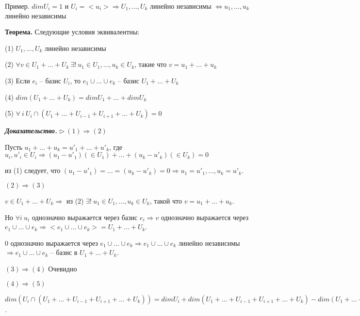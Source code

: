 \vspace{\baselineskip}
Пример. $dim U_i = 1$ и $U_i = <u_i> \Rightarrow U_1, \dots, U_k$ линейно независимы $\Leftrightarrow u_1, \dots, u_k$ линейно независимы

\vspace{\baselineskip}
\textbf{Теорема.} Следующие условия эквивалентны:

(1) $U_1, \dots, U_k$ линейно независимы

(2) $\forall v \in U_1 + \dots + U_k \ \exists! \ u_1 \in U_1, \dots, u_k \in U_k$, такие что $v = u_1 + \dots + u_k$

(3) Если $e_i$ -- базис $U_i$, то $e_1 \cup \dots \cup e_k$ -- базис $U_1 + \dots + U_k$

(4) $dim(U_1 + \dots + U_k) = dim U_1 + \dots + dim U_k$

(5) $\forall \ i \ U_i \cap (U_1 + \dots + U_{i-1} + U_{i+1} + \dots + U_k) = 0$

\vspace{\baselineskip}
\textbf{\textit{Доказательство.}} $\rhd \ (1) \Rightarrow (2)$ 

Пусть $u_1 + \dots + u_k = u'_1 + \dots + u'_k$, где $u_i, u'_i \in U_i \Rightarrow (u_1 - u'_1) (\in U_1) + \dots + (u_k - u'_k) (\in U_k) = 0$

из (1) следует, что $(u_1 - u'_1) = \dots = (u_k - u'_k) = 0 \Rightarrow u_1 = u'_1, \dots, u_k = u'_k$.

\vspace{\baselineskip}
$(2) \Rightarrow (3)$

$v \in U_1 + \dots + U_k \Rightarrow$ из (2) $\exists! \ u_1 \in U_1, \dots, u_k \in U_k$, такой что $v = u_1 + \dots + u_k$.

Но $\forall i \ u_i$ однозначно выражается через базис $e_i \Rightarrow v$ однозначно выражается через $e_1 \cup \dots \cup e_k \Rightarrow <e_1 \cup \dots \cup e_k> = U_1 + \dots + U_k$.

0 однозначно выражается через $e_1 \cup \dots \cup e_k \Rightarrow e_1 \cup \dots \cup e_k$ линейно независимы $\Rightarrow e_1 \cup \dots \cup e_k$ -- базис в $U_1 + \dots + U_k$.

\vspace{\baselineskip}
$(3) \Rightarrow (4)$ Очевидно

\vspace{\baselineskip}
$(4) \Rightarrow (5)$

$dim (U_i \cap (U_1 + \dots + U_{i-1} + U_{i+1} + \dots + U_k)) = dimU_i + dim(U_1 + \dots + U_{i-1} + U_{i+1} + \dots + U_k) - dim (U_1 + \dots + U_k) \leq dimU_i + dim U_1 + \dots + dimU_{i-1} + dimU_{i+1} + \dots + dimU_k - (dim U_1 + \dots + dim U_k) = 0 \Rightarrow dim(U_i \cap (U_1 + \dots + U_{i-1} + U_{i+1} + \dots + U_k)) = 0 \Rightarrow U_i \cap (U_1 + \dots + U_{i-1} + U_{i+1} + \dots + U_k) = 0$.

